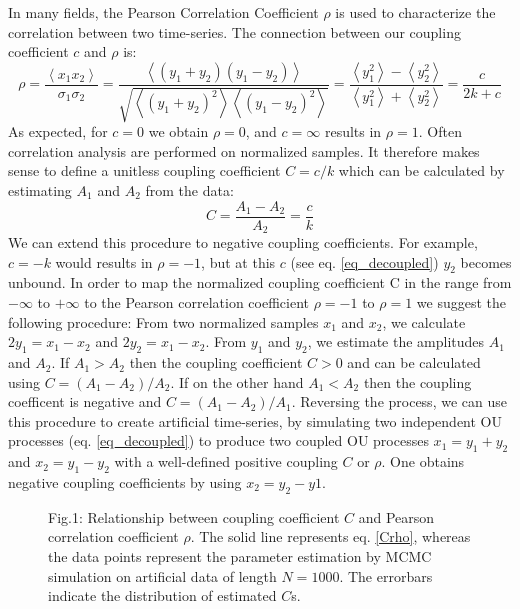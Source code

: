 \documentclass[%
 reprint,
 amsmath,amssymb,
 aps,
]{revtex4-1}
\begin{document}
In many fields, the Pearson Correlation Coefficient $\rho$ is used to characterize the correlation between two time-series.  The connection between our coupling coefficient $c$ and $\rho$ is:
\begin{equation}
	\rho = \frac{\left<x_{1}x_{2}\right>}{\sigma_{1}\sigma_{2}} = \frac{\left<(y_{1}+y_{2})(y_{1}-y_{2})\right>}{\sqrt{\left<(y_{1}+y_{2})^{2}\right>\left<(y_{1}-y_{2})^{2}\right>}} = \frac{\left<y_{1}^{2}\right>-\left<y_{2}^{2}\right>}{\left<y_{1}^{2}\right>+\left<y_{2}^{2}\right>} = \frac{c}{2k+c}
\end{equation}
As expected, for $c=0$ we obtain $\rho=0$, and $c=\infty$ results in $\rho=1$. Often correlation analysis are performed on normalized samples.  It therefore makes sense to define a unitless coupling coefficient $C=c/k$  which can be calculated by estimating $A_1$ and $A_2$ from the data:
\begin{equation}\label{Crho}
	C = \frac{A_{1}-A_{2}}{A_{2}}=\frac{c}{k}
\end{equation}
We can extend this procedure to negative coupling coefficients.  For example, $c=-k$ would results in $\rho=-1$, but at this $c$ (see eq. \ref{eq_decoupled}) $y_2$ becomes unbound.  In order to map the normalized coupling coefficient C in the range from $-\infty$ to $+\infty$ to the Pearson correlation coefficient $\rho=-1$ to $\rho=1$ we suggest the following procedure:  From two normalized samples $x_1$ and $x_2$, we calculate $2y_{1}=x_{1}-x_{2}$ and $2y_{2}=x_{1}-x_{2}$.  From $y_1$ and $y_2$, we estimate the amplitudes $A_{1}$ and $A_{2}$.  If $A_{1}>A_{2}$ then the coupling coefficient $C>0$ and can be calculated using $C=(A_{1}-A_{2})/A_{2}$.  If on the other hand $A_{1}<A_{2}$ then the coupling coefficent is negative and $C=(A_{1}-A_{2})/A_{1}$.  Reversing the process, we can use this procedure to create artificial time-series, by simulating two independent OU processes (eq. \ref{eq_decoupled}) to produce two coupled OU processes $x_{1}=y_{1}+y_{2}$ and $x_{2}=y_{1}-y_{2}$ with a well-defined positive coupling $C$ or $\rho$.  One obtains negative coupling coefficients by using $x_{2}=y_{2}-y{1}$.

\begin{figure}[H]
\begin{center}
\caption{Fig.1: Relationship between coupling coefficient $C$ and Pearson correlation coefficient $\rho$.  The solid line represents eq. \ref{Crho}, whereas the data points represent the parameter estimation by MCMC simulation on artificial data of length $N=1000$.  The errorbars indicate the distribution of estimated $C$s.}\label{fig:corr}
\end{center}
\end{figure}
\end{document}
